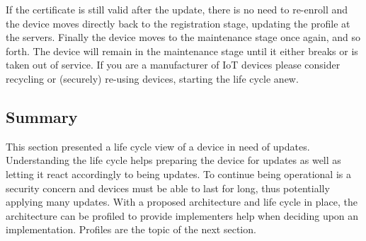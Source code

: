 \documentclass[0-thesis.tex]{subfiles}
\begin{document}
If the certificate is still valid after the update, there is no need to re-enroll and the
device moves directly back to the registration stage, updating the profile at the servers.
Finally the device moves to the maintenance stage once again, and so forth. The device
will remain in the maintenance stage until it either breaks or is taken out of service. If
you are a manufacturer of IoT devices please consider recycling or (securely) re-using
devices, starting the life cycle anew.

\subsection{Summary}
\label{ssec:life-cycle-summary}
This section presented a life cycle view of a device in need of updates. Understanding the
life cycle helps preparing the device for updates as well as letting it react accordingly
to being updates. To continue being operational is a security concern and devices must be
able to last for long, thus potentially applying many updates. With a proposed
architecture and life cycle in place, the architecture can be profiled to provide
implementers help when deciding upon an implementation. Profiles are the topic of the next
section.
\end{document}
